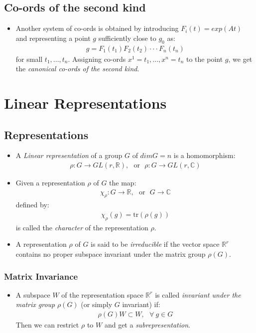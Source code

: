 \documentclass[11pt]{article}
\numberwithin{equation}{section}
\DeclareRobustCommand{\RR}{\mathbb{R}}
\DeclareRobustCommand{\CC}{\mathbb{C}}
\begin{document}
\subsection{Co-ords of the second kind}
\begin{itemize}
  \item Another system of co-ords is obtained by introducing $F_i(t)= exp (At)$ and representing a point $g$ sufficiently close to $g_0$ as:
  \begin{align*}
    g = F_1(t_1)F_2(t_2)\cdot \cdot \cdot F_n(t_n)
  \end{align*}
  for small $t_1,...,t_n$. Assigning co-ords $x^1=t_1,...,x^n=t_n$ to the point $g$, we get the \emph{canonical co-ords of the second kind}.  
\end{itemize}


\newpage
\section{Linear Representations}
\subsection{Representations}
\begin{itemize}
  \item A \emph{Linear representation} of a group $G$ of $dimG = n$ is a homomorphism:
  \begin{align*}
    \rho:G \rightarrow GL(r,\RR), ~~~\text{or}~~~\rho: G\rightarrow GL(r,\CC)
  \end{align*}

\item Given a representation $\rho$ of $G$ the map: 
\begin{align*}
  \chi_{\rho}: G \rightarrow \RR, ~~~\text{or}~~~G \rightarrow \CC
\end{align*}
defined by:
\begin{align*}
\chi_{\rho}(g) = \text{tr}(\rho(g))
\end{align*}
is called the \emph{character} of the representation $\rho$. 

\item A representation $\rho$ of $G$ is said to be \emph{irreducible} if the vector space $\RR^r$ contains no proper subspace invariant under the matrix group $\rho(G)$. 
\end{itemize}

\subsubsection{Matrix Invariance}
\begin{itemize}
  \item A subspace $W$ of the representation space $\RR^r$ is called \emph{invariant under the matrix group} $\rho(G)$ (or simply $G$ invariant) if:
  \begin{align*}
    \rho(G)W \subset W,~~~\forall~g \in G
  \end{align*}
  Then we can restrict $\rho$ to $W$ and get a \emph{subrepresentation}.
\end{itemize}
\end{document}
